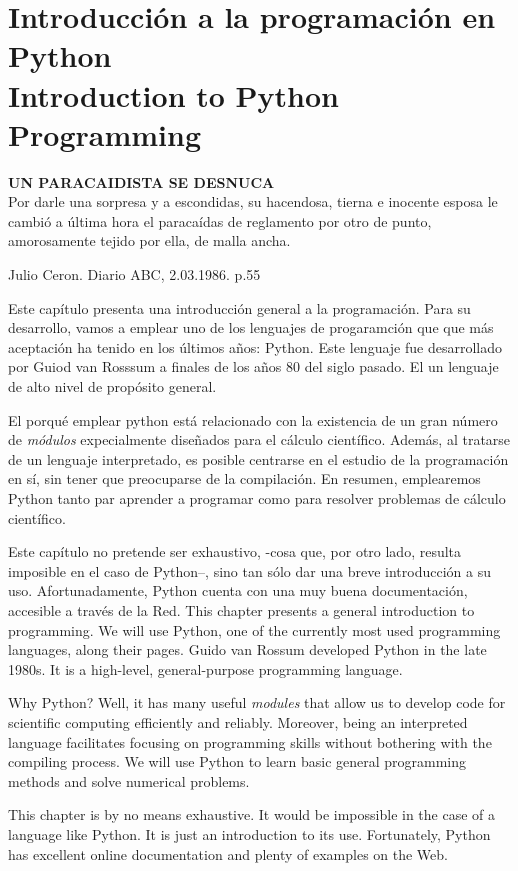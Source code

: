 \chapter{Introducción a la programación en Python\\ Introduction to Python Programming}\label{ch:intpr}  
\epigraph{\textbf{UN PARACAIDISTA SE DESNUCA}\\ Por darle una sorpresa y a escondidas, su hacendosa, tierna e inocente esposa le cambió a última hora el paracaídas de reglamento por otro de punto, amorosamente tejido por ella, de malla ancha.}{Julio Ceron. Diario ABC, 2.03.1986. p.55}
\begin{paracol}{2}
Este capítulo presenta una introducción general a la programación. Para su desarrollo, vamos a emplear uno de los lenguajes de progaramción que  que más aceptación ha tenido en los últimos años: Python. Este lenguaje fue desarrollado por Guiod van Rosssum a finales de los años 80 del siglo pasado. El un lenguaje de alto nivel de propósito general.

El porqué emplear python está relacionado con la existencia de un gran número de \emph{módulos} expecialmente diseñados para el cálculo científico. Además, al tratarse de un lenguaje interpretado, es posible centrarse en el estudio de la programación en sí, sin tener que preocuparse de la compilación. En resumen, emplearemos Python tanto par aprender a programar como para resolver problemas de cálculo científico.

Este capítulo no pretende ser exhaustivo, -cosa que, por otro lado, resulta imposible en el caso de Python--, sino tan sólo dar una breve introducción a su uso. Afortunadamente, Python cuenta con una muy buena documentación, accesible a través de la Red. 
\switchcolumn 
This chapter presents a general introduction to programming. We will use Python, one of the currently most used programming languages, along their pages. Guido van Rossum developed Python in the late 1980s. It is a high-level, general-purpose programming language. 

Why Python? Well, it has many useful \emph{modules} that allow us to develop code for scientific computing efficiently and reliably. Moreover, being an interpreted language facilitates focusing on programming skills without bothering with the compiling process. We will use Python to learn basic general programming methods and solve numerical problems.

This chapter is by no means exhaustive. It would be impossible in the case of a language like Python. It is just an introduction to its use. Fortunately, Python has excellent online documentation and plenty of examples on the Web. 
\end{paracol}


